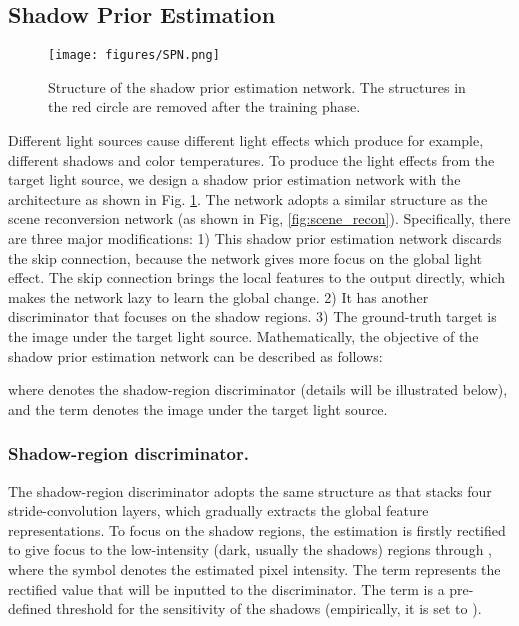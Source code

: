 \documentclass[runningheads]{llncs}
\begin{document}
\subsection{Shadow Prior Estimation}
\label{shadowprior}
\begin{figure}[t]
    \centering
    \texttt{[image: figures/SPN.png]}
   \baselineskip 
    \caption{Structure of the shadow prior estimation network. The structures in the red circle are removed after the training phase.
}
    \label{fig:SPN}
   \baselineskip 
\end{figure}
Different light sources cause different light effects which produce for example, different shadows and color temperatures. To produce the light effects from the target light source, we design a shadow prior estimation network with the architecture as shown in Fig. \ref{fig:SPN}. The network adopts a similar structure as the scene reconversion network (as shown in Fig, \ref{fig:scene_recon}). Specifically, there are three major modifications: 1) This shadow prior estimation network discards the skip connection, because the network gives more focus on the global light effect. The skip connection brings the local features to the output directly, which makes the network lazy to learn the global change. 2) It has another discriminator that focuses on the shadow regions. 3) The ground-truth target is the image under the target light source.  Mathematically, the objective of the shadow prior estimation network can be described as follows:

where  denotes the shadow-region discriminator (details will be illustrated below), and the term  denotes the image under the target light source.

\vskip -0.5cm
\baselineskip 
\subsubsection{Shadow-region discriminator.}
\label{shad_discri}
The shadow-region discriminator adopts the same structure as \cite{pix2pix} that stacks four stride-convolution layers, which gradually extracts the global feature representations. To focus on the shadow regions, the estimation is firstly rectified to give focus to the low-intensity (dark, usually the shadows) regions through , where the symbol  denotes the estimated pixel intensity. The term  represents the rectified value that will be inputted to the discriminator. The term  is a pre-defined threshold for the sensitivity of the shadows (empirically, it is set to ). 
\end{document}
